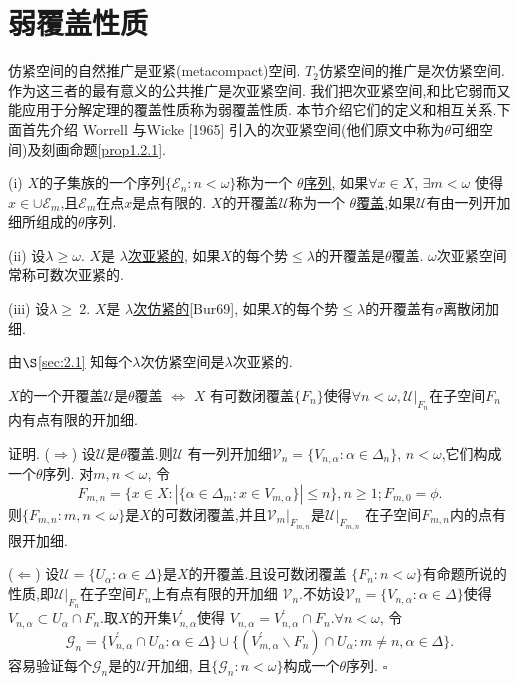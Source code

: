 \documentclass[main.tex]{subfiles}
\begin{document}
\section{弱覆盖性质}\label{sec:1.2}

仿紧空间的自然推广是亚紧(metacompact)空间.
$T_2$仿紧空间的推广是次仿紧空间.
作为这三者的最有意义的公共推广是次亚紧空间.
我们把次亚紧空间,和比它弱而又能应用于分解定理的覆盖性质称为弱覆盖性质.
本节介绍它们的定义和相互关系.下面首先介绍 Worrell 与Wicke [1965] 引入的次亚紧空间(他们原文中称为$\theta$可细空间)及刻画命题\ref{prop1.2.1}.

\begin{definition}
\textnormal{(i)} $X$的子集族的一个序列$\{\mathscr{E}_n:n<\omega\}$称为一个
\underline{$\theta$序列},
如果$\forall x\in X$, $ \exists m < \omega$ 使得$x\in\cup \mathscr{E}_m$,且$\mathscr{E}_m$在点$x$是点有限的.
$X$的开覆盖$\mathscr{U}$称为一个 \underline{$\theta$覆盖},如果$\mathscr{U}$有由一列开加细所组成的$\theta$序列.

\textnormal{(ii)} 设$\lambda\ge\omega$. $X$是 \underline{$\lambda$次亚紧的},
如果$X$的每个势$\le\lambda$的开覆盖是$\theta$覆盖.
$\omega$次亚紧空间常称可数次亚紧的.


\textnormal{(iii)} 设$\lambda\ge\ 2$. $X$是 \underline{$\lambda$次仿紧的}\textnormal{[Bur69]},
如果$X$的每个势$\le\lambda$的开覆盖有$\sigma$离散闭加细.
\end{definition}

由$\S$\ref{sec:2.1} 知每个$\lambda$次仿紧空间是$\lambda$次亚紧的.

\begin{proposition}\label{prop1.2.1}
$X$的一个开覆盖$\mathscr{U}$是$\theta$覆盖 $\Leftrightarrow$
$X$ 有可数闭覆盖$\{F_n\}$使得$\forall n < \omega, \mathscr{U}|_{F_n}$在子空间${F_n}$内有点有限的开加细.
\end{proposition}

证明. ($\Rightarrow$) 设$\mathscr{U}$是$\theta$覆盖.则$\mathscr{U}$
有一列开加细$\mathscr{V}_n = \{V_{n, \alpha}: \alpha\in \Delta_n\}$,
$n<\omega$,它们构成一个$\theta$序列.
对$m,n<\omega$, 令
$$F_{m,n}=\{x\in X: |\{\alpha\in\Delta_m: x\in V_{m,\alpha}\}|\le n\}, n\ge 1; F_{m,0} = \phi.$$
则$\{F_{m,n}:m,n<\omega\}$是$X$的可数闭覆盖,并且$\mathscr{V}_m|_{F_{m,n}}$是$\mathscr{U}|_{F_{m,n}}$
在子空间$F_{m,n}$内的点有限开加细.

($\Leftarrow$) 设$\mathscr{U} = \{ U_\alpha: \alpha\in\Delta\}$是$X$的开覆盖.且设可数闭覆盖
$\{F_n:n<\omega\}$有命题所说的性质,即$\mathscr{U}|_{F_n}$在子空间$F_n$上有点有限的开加细
$\mathscr{V}_n$.不妨设$\mathscr{V}_n=\{V_{n,\alpha}:\alpha\in\Delta\}$使得
$V_{n,\alpha}\subset U_\alpha\cap F_n$.取$X$的开集$V_{n,\alpha}^\prime$使得
$V_{n,\alpha}=V_{n,\alpha}^\prime\cap F_n$.$\forall n<\omega$, 令
$$\mathscr{G}_n=\{V_{n,\alpha}^\prime\cap U_\alpha:\alpha\in\Delta\}
\cup\{(V_{m,\alpha}^\prime\backslash F_n)\cap U_\alpha: m\ne n, \alpha\in\Delta\}.$$
容易验证每个$\mathscr{G}_n$是的$\mathscr{U}$开加细,
且$\{\mathscr{G}_n:n<\omega\}$构成一个$\theta$序列.  $\square$
\end{document}
